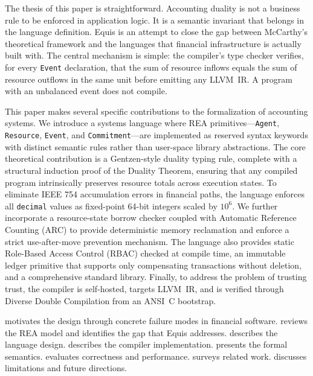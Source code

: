 \documentclass[11pt,a4paper]{article}
\theoremstyle{remark}
\begin{document}
The thesis of this paper is straightforward. Accounting duality is not a
business rule to be enforced in application logic. It is a semantic
invariant that belongs in the language definition. Equis is an attempt
to close the gap between McCarthy's theoretical framework and the
languages that financial infrastructure is actually built with. The
central mechanism is simple: the compiler's type checker verifies, for
every \texttt{Event} declaration, that the sum of resource inflows
equals the sum of resource outflows in the same unit before emitting any
LLVM~IR. A program with an unbalanced event does not compile.

This paper makes several specific contributions to the formalization of
accounting systems. We introduce a systems language where REA
primitives---\texttt{Agent}, \texttt{Resource}, \texttt{Event}, and
\texttt{Commitment}---are implemented as reserved syntax keywords with
distinct semantic rules rather than user-space library abstractions. The
core theoretical contribution is a Gentzen-style duality typing rule,
complete with a structural induction proof of the Duality Theorem,
ensuring that any compiled program intrinsically preserves resource
totals across execution states. To eliminate IEEE 754 accumulation
errors in financial paths, the language enforces all \texttt{decimal}
values as fixed-point 64-bit integers scaled by $10^{6}$. We further
incorporate a resource-state borrow checker coupled with Automatic
Reference Counting (ARC) to provide deterministic memory reclamation and
enforce a strict use-after-move prevention mechanism. The language also
provides static Role-Based Access Control (RBAC) checked at compile
time, an immutable ledger primitive that supports only compensating
transactions without deletion, and a comprehensive standard library.
Finally, to address the problem of trusting trust, the compiler is
self-hosted, targets LLVM~IR, and is verified through Diverse Double
Compilation from an ANSI~C bootstrap.

 motivates the design through concrete failure
modes in financial software.  reviews the REA model and
identifies the gap that Equis addresses.  describes the
language design.  describes the compiler implementation.
 presents the formal semantics. 
evaluates correctness and performance.  surveys
related work.  discusses limitations and future
directions.

\end{document}

